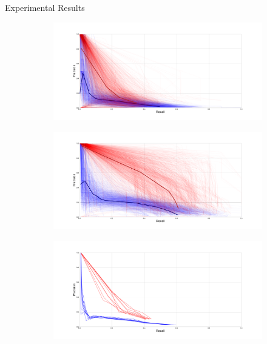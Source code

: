 \documentclass[svgnames,final]{beamer}
\begin{document}
\begin{frame}
\begin{columns}[T]
\begin{column}{.3\linewidth}
\begin{block}{Experimental Results}
		\begin{figure}[h]
		\centering
		\begin{subfigure}{.5\textwidth}
		  \centering
		  \includegraphics[width=\linewidth]{images/2.pdf}
		  \label{fig:sub1}
		\end{subfigure}%
		\begin{subfigure}{.5\textwidth}
		  \centering
		  \includegraphics[width=\linewidth]{images/1.pdf}
		  \label{fig:sub2}
		\end{subfigure}
		\begin{subfigure}{.5\textwidth}
		  \centering
		  \includegraphics[width=\linewidth]{images/4.pdf}
		  \label{fig:sub3}
		\end{subfigure}%
		\begin{subfigure}{.5\textwidth}

\end{subfigure}
\end{figure}
\end{block}
\end{column}
\end{columns}
\end{frame}
\end{document}
